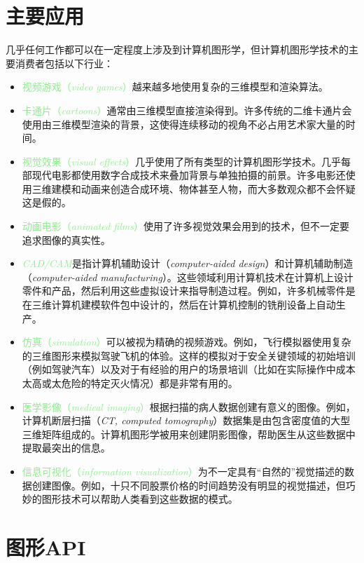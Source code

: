 \documentclass[lang=cn,12pt,marginpar=margintrue]{elegantbook}
\begin{document}
\section{主要应用}

几乎任何工作都可以在一定程度上涉及到计算机图形学，但计算机图形学技术的主要消费者包括以下行业：
\begin{itemize}
  \item \textcolor{lightgreen}{视频游戏（\textit{video games}）}越来越多地使用复杂的三维模型和渲染算法。
  \item \textcolor{lightgreen}{卡通片（\textit{cartoons}）}通常由三维模型直接渲染得到。许多传统的二维卡通片会使用由三维模型渲染的背景，这使得连续移动的视角不必占用艺术家大量的时间。
  \item \textcolor{lightgreen}{视觉效果（\textit{visual effects}）}几乎使用了所有类型的计算机图形学技术。几乎每部现代电影都使用数字合成技术来叠加背景与单独拍摄的前景。许多电影还使用三维建模和动画来创造合成环境、物体甚至人物，而大多数观众都不会怀疑这是假的。
  \item \textcolor{lightgreen}{动画电影（\textit{animated films}）}使用了许多视觉效果会用到的技术，但不一定要追求图像的真实性。
  \item \textcolor{lightgreen}{\textit{CAD/CAM}}是指计算机辅助设计（\textit{computer-aided design}）和计算机辅助制造（\textit{computer-aided manufacturing}）。这些领域利用计算机技术在计算机上设计零件和产品，然后利用这些虚拟设计来指导制造过程。例如，许多机械零件是在三维计算机建模软件包中设计的，然后在计算机控制的铣削设备上自动生产。
  \item \textcolor{lightgreen}{仿真（\textit{simulation}）}可以被视为精确的视频游戏。例如，飞行模拟器使用复杂的三维图形来模拟驾驶飞机的体验。这样的模拟对于安全关键领域的初始培训（例如驾驶汽车）以及对于有经验的用户的场景培训（比如在实际操作中成本太高或太危险的特定灭火情况）都是非常有用的。
  \item \textcolor{lightgreen}{医学影像（\textit{medical imaging}）}根据扫描的病人数据创建有意义的图像。例如，计算机断层扫描（\textit{CT, computed tomography}）数据集是由包含密度值的大型三维矩阵组成的。计算机图形学被用来创建阴影图像，帮助医生从这些数据中提取最突出的信息。
  \item \textcolor{lightgreen}{信息可视化（\textit{information visualization}）}为不一定具有“自然的”视觉描述的数据创建图像。例如，十只不同股票价格的时间趋势没有明显的视觉描述，但巧妙的图形技术可以帮助人类看到这些数据的模式。
\end{itemize}

\section{图形API}
\end{document}
